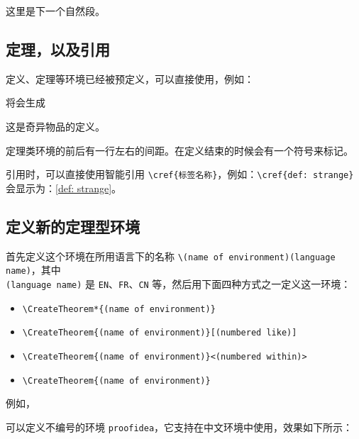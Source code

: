 \documentclass{einfart}
\begin{document}
这里是下一个自然段。

\subsection{定理，以及引用}

定义、定理等环境已经被预定义，可以直接使用，例如：


定理类环境的前后有一行左右的间距。在定义结束的时候会有一个符号来标记。

引用时，可以直接使用智能引用 \lstinline|\cref{标签名称}|，例如：\lstinline|\cref{def: strange}| 会显示为：\cref{def: strange}。

\subsection{定义新的定理型环境}

首先定义这个环境在所用语言下的名称 \lstinline|\(name of environment)(language name)|，其中 \\\lstinline|(language name)| 是 \lstinline|EN|、\lstinline|FR|、\lstinline|CN| 等，然后用下面四种方式之一定义这一环境：
\begin{itemize}
    \item \lstinline|\CreateTheorem*{(name of environment)}|
    \item \lstinline|\CreateTheorem{(name of environment)}[(numbered like)]|
    \item \lstinline|\CreateTheorem{(name of environment)}<(numbered within)>|
    \item \lstinline|\CreateTheorem{(name of environment)}|
\end{itemize}

\def\proofideanameCN{思路}

例如，

\begin{code}
  \def\proofideanameCN{思路}
\end{code}
可以定义不编号的环境 \lstinline|proofidea|，它支持在中文环境中使用，效果如下所示：
\end{document}
